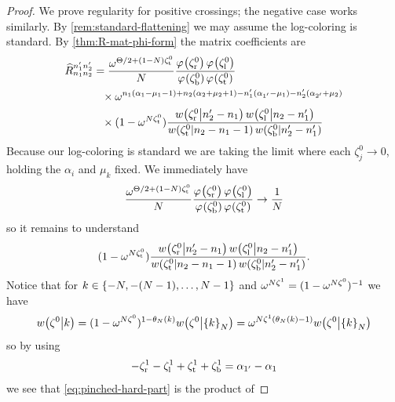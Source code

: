 \documentclass{sl2ams}
\numberwithin{equation}{section}
\begin{document}
\begin{proof}
  We prove regularity for positive crossings; the negative case works similarly.
  By \cref{rem:standard-flattening} we may assume the log-coloring is standard.
  By \cref{thm:R-mat-phi-form} the matrix coefficients are
  \[
    \begin{aligned}
      \rmat{n_1}{n_2}{n_1'}{n_2'}
    &=
    \frac{
      \omega^{\Theta/2 + (1 - \nr)\zeta_{\lW}^{0}}
      }{
      \nr 
    }
    \frac{
      \pf{\zeta_{\lN}^0}
      \pf{\zeta_{\lS}^0}
      }{
      \pf{\zeta_{\lE}^0}
      \pf{\zeta_{\lW}^0}
    }
    \\
    &\phantom{=}\times
    \omega^{
      n_1(\alpha_{1}  -\mu_1 - 1)
      +
      n_2(\alpha_{2} + \mu_2 + 1)
      -
      n_1'(\alpha_{1'} -\mu_1)
      -
      n_2'(\alpha_{2'} + \mu_2)
    }
    \\
    &\phantom{=}\times
    ( 1 - \omega^{\nr \zeta_{\lW}^{0}} )
    \frac{
      \qlog{\zeta_{\lN}^0}{n_2' - n_1}
      \qlog{\zeta_{\lS}^0}{n_2 - n_1'}
      }{
      \qlog{\zeta_{\lW}^0}{n_2 - n_1 - 1}
      \qlog{\zeta_{\lE}^0}{n_2' - n_1'}
    }
  \end{aligned}
  \]
    Because our log-coloring is standard we are taking the limit where each \(\zeta_j^0 \to 0\), holding the \(\alpha_{i}\) and \(\mu_{k}\) fixed.
    We immediately have
    \[
    \frac{
      \omega^{\Theta/2 + (1 - \nr) \zeta_{\lW}^{0}}
      }{
      \nr 
    }
    \frac{
      \pf{\zeta_{\lN}^0}
      \pf{\zeta_{\lS}^0}
      }{
      \pf{\zeta_{\lE}^0}
      \pf{\zeta_{\lW}^0}
    }
      \to
      \frac{
        1
        }{
        \nr
      }
    \]
    so it remains to understand
    \begin{equation}
      \label{eq:pinched-hard-part}
      (1 - \omega^{N \zeta_{\mathrm{t}}^{0}} )
      \frac{
        w\mathopen{}\left(\zeta_{\mathrm{r}}^0 \middle | n_2' - n_1 \right)
        w\mathopen{}\left(\zeta_{\mathrm{l}}^0 \middle | n_2 - n_1' \right)
        }{
        w\mathopen{}\left(\zeta_{\mathrm{t}}^0 \middle | n_2 - n_1 - 1 \right)
        w\mathopen{}\left(\zeta_{\mathrm{b}}^0 \middle | n_2' - n_1' \right)
      }
      .
    \end{equation}
    Notice that for \(k \in \set{-\nr, -(\nr -1), \dots, \nr -1}\) and
    \(
    \omega^{N \zeta^1} = (1 - \omega^{N \zeta^0})^{-1}
    \)
    we have
    \[
      w\mathopen{}\left(\zeta^0 \middle | k \right)
      =
      (1 - \omega^{N \zeta^0})^{1 - \theta_{N}\mathopen{}\left(k\right)} w\mathopen{}\left(\zeta^0 \middle | \left\{k\right\}_{N} \right)
      =
      \omega^{N \zeta^1(\theta_{N}\mathopen{}\left(k\right) - 1)} w\mathopen{}\left(\zeta^0 \middle | \left\{k\right\}_{N} \right)
    \]
    so by using
    \[
      -\zeta_{\mathrm{r}}^1 - \zeta_{\mathrm{l}}^1
      +\zeta_{\mathrm{t}}^1 + \zeta_{\mathrm{b}}^1
      =
      \alpha_{1'} - \alpha_{1}
    \]
    we see that \eqref{eq:pinched-hard-part} is the product of

\end{proof}
\end{document}
